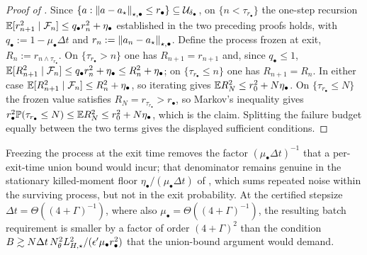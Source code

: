 \begin{proof}[Proof of ]
Since $\{a:\left\lVert a-a_\star\right\rVert_{\star,\bullet}\leq r_\bullet\}\subseteq\mathcal{U}_{\delta_\bullet}$, on
$\{n<\tau_{r_\bullet}\}$ the one-step recursion
$\mathbb{E}[r_{n+1}^2\mid\mathcal{F}_n]\leq q_\bullet r_n^2+\eta_\bullet$ established in the two preceding proofs
holds, with $q_\bullet:=1-\mu_\bullet\Delta t$ and $r_n:=\left\lVert a_n-a_\star\right\rVert_{\star,\bullet}$. Define the
process frozen at exit, $R_n:=r_{n\wedge\tau_{r_\bullet}}$. On $\{\tau_{r_\bullet}>n\}$ one has
$R_{n+1}=r_{n+1}$ and, since $q_\bullet\leq1$,
$\mathbb{E}[R_{n+1}^2\mid\mathcal{F}_n]\leq q_\bullet r_n^2+\eta_\bullet\leq R_n^2+\eta_\bullet$; on
$\{\tau_{r_\bullet}\leq n\}$ one has $R_{n+1}=R_n$. In either case
$\mathbb{E}[R_{n+1}^2\mid\mathcal{F}_n]\leq R_n^2+\eta_\bullet$, so iterating gives $\mathbb{E} R_N^2\leq r_0^2+N\eta_\bullet$.
On $\{\tau_{r_\bullet}\leq N\}$ the frozen value satisfies $R_N=r_{\tau_{r_\bullet}}>r_\bullet$, so
Markov's inequality gives
$r_\bullet^2\mathbb{P}(\tau_{r_\bullet}\leq N)\leq\mathbb{E} R_N^2\leq r_0^2+N\eta_\bullet$, which is the claim.
Splitting the failure budget equally between the two terms gives the displayed sufficient conditions.
\end{proof}

Freezing the process at the exit time removes the factor $(\mu_\bullet\Delta t)^{-1}$ that a
per-exit-time union bound would incur; that denominator remains genuine in the stationary killed-moment
floor $\eta_\bullet/(\mu_\bullet\Delta t)$ of , which sums
repeated noise within the surviving process, but not in the exit probability. At the certified stepsize
$\Delta t=\Theta((4+\Gamma)^{-1})$, where also $\mu_\bullet=\Theta((4+\Gamma)^{-1})$, the resulting
batch requirement is smaller by a factor of order $(4+\Gamma)^2$ than the condition
$B\gtrsim N\Delta t\,N_\theta^2L_{H,\star}^2/(\epsilon'\mu_\bullet r_\bullet^2)$ that the union-bound argument
would demand.

